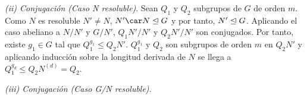 \begin{teorema}
\begin{demostracion}
\begin{figure}[h!]
\begin{tikzpicture}[node distance=2cm, scale=1, transform shape]
			\end{tikzpicture}
		\end{figure}
		
		\textit{(ii) Conjugación (Caso N resoluble)}. Sean $Q_1$ y $Q_2$ subgrupos de $G$ de orden $m$. Como $N$ es resoluble $N'\neq N$, $N'\car N\norm G$ y por tanto, $N'\norm G$. Aplicando el caso abeliano a $N/N'$ y $G/N'$, $Q_1N'/N'$ y $Q_2N'/N'$ son conjugados. Por tanto, existe $g_1\in G$ tal que $Q_1^{g_1} \leq Q_2 N'$. %
		$Q_1^{g_1}$ y $Q_2$ son subgrupos de orden $m$ en $Q_2N'$ y aplicando inducción sobre la longitud derivada de $N$ se llega a $Q_1^{g_d}\leq Q_2N^{(d)} = Q_2$.
		
		\textit{(iii) Conjugación (Caso G/N resoluble)}.
	\end{demostracion}
\end{teorema}
